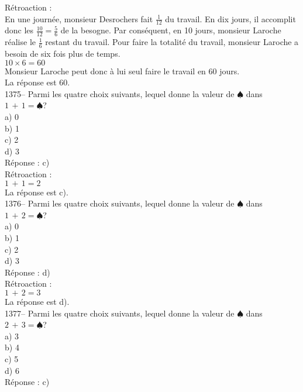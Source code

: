 ﻿\documentclass[letterpaper, 12pt]{article}
\begin{document}
R\'etroaction : \\
En une journ\'ee, monsieur Desrochers fait $\frac{1}{12}$ du travail.  En
dix jours, il accomplit donc les $\frac{10}{12}=\frac{5}{6}$ de la besogne.
Par cons\'equent, en 10 jours, monsieur Laroche r\'ealise le $\frac{1}{6}$
restant du travail.  Pour faire la totalit\'e du travail, monsieur Laroche a
besoin de six fois plus de temps.\\
$10\times6=60$\\
Monsieur Laroche peut donc \`a lui seul faire le travail en 60 jours.  \\
La r\'eponse est 60.\\



1375-- Parmi les quatre choix suivants, lequel donne la valeur de
$\spadesuit$ dans $1\,+\,1=\spadesuit$?\\
a) 0\\
b) 1\\
c) 2\\
d) 3\\

R\'eponse : c)\\

R\'etroaction : \\
$1\,+\,1=2$\\
La r\'eponse est c).\\

1376-- Parmi les quatre choix suivants, lequel donne la valeur de
$\spadesuit$ dans $1\,+\,2=\spadesuit$?\\
a) 0\\
b) 1\\
c) 2\\
d) 3\\

R\'eponse : d)\\

R\'etroaction : \\
$1\,+\,2=3$\\
La r\'eponse est d).\\

1377-- Parmi les quatre choix suivants, lequel donne la valeur de
$\spadesuit$ dans $2\,+\,3=\spadesuit$?\\
a) 3\\
b) 4\\
c) 5\\
d) 6\\

R\'eponse : c)\\
\end{document}
